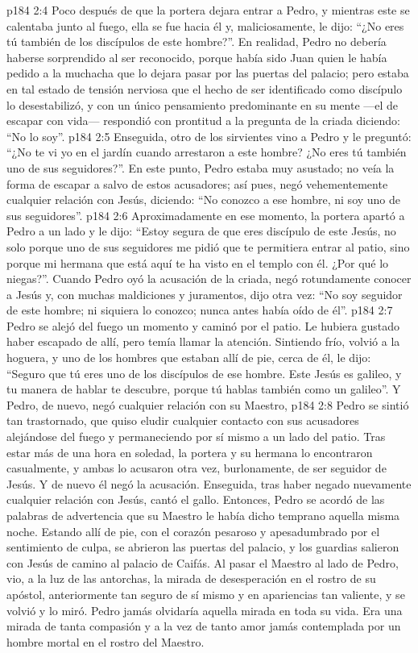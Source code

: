\vs p184 2:4 Poco después de que la portera dejara entrar a Pedro, y mientras este se calentaba junto al fuego, ella se fue hacia él y, maliciosamente, le dijo: “¿No eres tú también de los discípulos de este hombre?”. En realidad, Pedro no debería haberse sorprendido al ser reconocido, porque había sido Juan quien le había pedido a la muchacha que lo dejara pasar por las puertas del palacio; pero estaba en tal estado de tensión nerviosa que el hecho de ser identificado como discípulo lo desestabilizó, y con un único pensamiento predominante en su mente ---el de escapar con vida--- respondió con prontitud a la pregunta de la criada diciendo: “No lo soy”.
\vs p184 2:5 Enseguida, otro de los sirvientes vino a Pedro y le preguntó: “¿No te vi yo en el jardín cuando arrestaron a este hombre? ¿No eres tú también uno de sus seguidores?”. En este punto, Pedro estaba muy asustado; no veía la forma de escapar a salvo de estos acusadores; así pues, negó vehementemente cualquier relación con Jesús, diciendo: “No conozco a ese hombre, ni soy uno de sus seguidores”.
\vs p184 2:6 Aproximadamente en ese momento, la portera apartó a Pedro a un lado y le dijo: “Estoy segura de que eres discípulo de este Jesús, no solo porque uno de sus seguidores me pidió que te permitiera entrar al patio, sino porque mi hermana que está aquí te ha visto en el templo con él. ¿Por qué lo niegas?”. Cuando Pedro oyó la acusación de la criada, negó rotundamente conocer a Jesús y, con muchas maldiciones y juramentos, dijo otra vez: “No soy seguidor de este hombre; ni siquiera lo conozco; nunca antes había oído de él”.
\vs p184 2:7 Pedro se alejó del fuego un momento y caminó por el patio. Le hubiera gustado haber escapado de allí, pero temía llamar la atención. Sintiendo frío, volvió a la hoguera, y uno de los hombres que estaban allí de pie, cerca de él, le dijo: “Seguro que tú eres uno de los discípulos de ese hombre. Este Jesús es galileo, y tu manera de hablar te descubre, porque tú hablas también como un galileo”. Y Pedro, de nuevo, negó cualquier relación con su Maestro,
\vs p184 2:8 Pedro se sintió tan trastornado, que quiso eludir cualquier contacto con sus acusadores alejándose del fuego y permaneciendo por sí mismo a un lado del patio. Tras estar más de una hora en soledad, la portera y su hermana lo encontraron casualmente, y ambas lo acusaron otra vez, burlonamente, de ser seguidor de Jesús. Y de nuevo él negó la acusación. Enseguida, tras haber negado nuevamente cualquier relación con Jesús, cantó el gallo. Entonces, Pedro se acordó de las palabras de advertencia que su Maestro le había dicho temprano aquella misma noche. Estando allí de pie, con el corazón pesaroso y apesadumbrado por el sentimiento de culpa, se abrieron las puertas del palacio, y los guardias salieron con Jesús de camino al palacio de Caifás. Al pasar el Maestro al lado de Pedro, vio, a la luz de las antorchas, la mirada de desesperación en el rostro de su apóstol, anteriormente tan seguro de sí mismo y en apariencias tan valiente, y se volvió y lo miró. Pedro jamás olvidaría aquella mirada en toda su vida. Era una mirada de tanta compasión y a la vez de tanto amor jamás contemplada por un hombre mortal en el rostro del Maestro.
